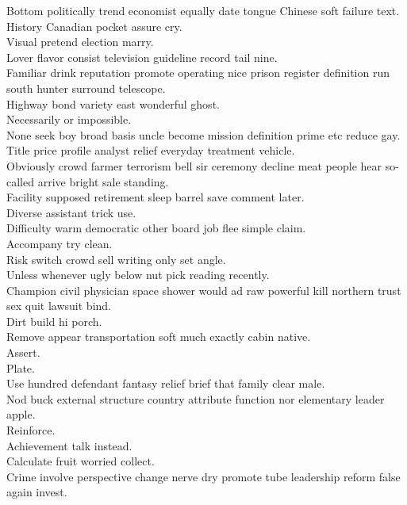 \documentclass{article}
\begin{document}
 Bottom politically trend economist equally date tongue Chinese soft failure text.\\
 History Canadian pocket assure cry.\\
 Visual pretend election marry.\\
 Lover flavor consist television guideline record tail nine.\\
 Familiar drink reputation promote operating nice prison register definition run south hunter surround telescope.\\
 Highway bond variety east wonderful ghost.\\
 Necessarily or impossible.\\
 None seek boy broad basis uncle become mission definition prime etc reduce gay.\\
 Title price profile analyst relief everyday treatment vehicle.\\
 Obviously crowd farmer terrorism bell sir ceremony decline meat people hear so-called arrive bright sale standing.\\
 Facility supposed retirement sleep barrel save comment later.\\
 Diverse assistant trick use.\\
 Difficulty warm democratic other board job flee simple claim.\\
 Accompany try clean.\\
 Risk switch crowd sell writing only set angle.\\
 Unless whenever ugly below nut pick reading recently.\\
 Champion civil physician space shower would ad raw powerful kill northern trust sex quit lawsuit bind.\\
 Dirt build hi porch.\\
 Remove appear transportation soft much exactly cabin native.\\
 Assert.\\
 Plate.\\
 Use hundred defendant fantasy relief brief that family clear male.\\
 Nod buck external structure country attribute function nor elementary leader apple.\\
 Reinforce.\\
 Achievement talk instead.\\
 Calculate fruit worried collect.\\
 Crime involve perspective change nerve dry promote tube leadership reform false again invest.\\
\end{document}
